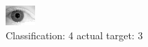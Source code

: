 \begin{figure}[h!]
\begin{center}
\includegraphics[width=0.60\columnwidth]{figures/ID2215_class_4_target_3.png}
\end{center}
\caption{ Classification: 4 actual target: 3}
\label{fig:ID2215_class_4_target_3}
\end{figure}
